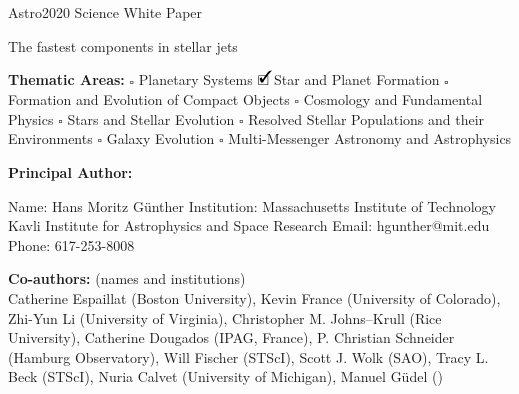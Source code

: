 \documentclass[12pt]{article}
\newcommand{\cmark}{\ding{51}}%
\newcommand{\done}{\rlap{$\square$}{\raisebox{2pt}{\large\hspace{1pt}\cmark}}%
\hspace{-2.5pt}}
\begin{document}
\raggedright
\huge
Astro2020 Science White Paper \linebreak

The fastest components in stellar jets \linebreak
\normalsize

\noindent \textbf{Thematic Areas:} \hspace*{60pt} $\square$ Planetary Systems \hspace*{10pt} $\done$ Star and Planet Formation \hspace*{20pt}\linebreak
$\square$ Formation and Evolution of Compact Objects \hspace*{31pt} $\square$ Cosmology and Fundamental Physics \linebreak
  $\square$  Stars and Stellar Evolution \hspace*{1pt} $\square$ Resolved Stellar Populations and their Environments \hspace*{40pt} \linebreak
  $\square$    Galaxy Evolution   \hspace*{45pt} $\square$             Multi-Messenger Astronomy and Astrophysics \hspace*{65pt} \linebreak
  
\textbf{Principal Author:}

Name:	Hans Moritz G\"unther
 \linebreak						
Institution: Massachusetts Institute of Technology
Kavli Institute for Astrophysics and Space Research 
 \linebreak
Email: hgunther@mit.edu
 \linebreak
Phone:  617-253-8008
 \linebreak
 
\textbf{Co-authors:} (names and institutions)\\
Catherine Espaillat (Boston University),
Kevin France (University of Colorado),
Zhi-Yun Li (University of Virginia), Christopher M. Johns--Krull (Rice University), Catherine Dougados (IPAG, France),
P. Christian Schneider (Hamburg Observatory), Will Fischer (STScI), Scott J. Wolk (SAO), Tracy L. Beck (STScI), Nuria Calvet (University of Michigan), Manuel G\"udel ()
  \linebreak
\end{document}
